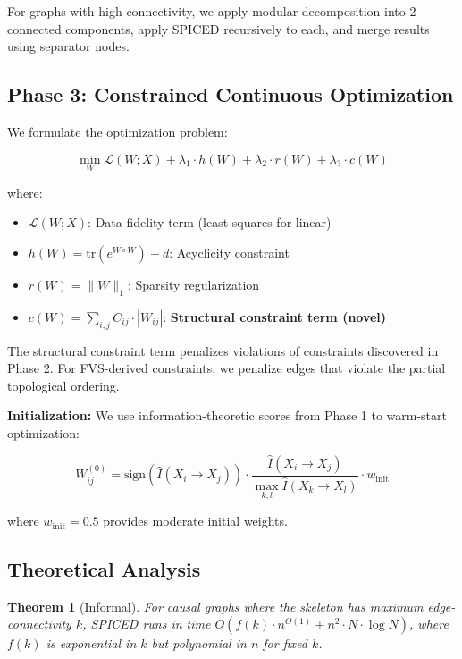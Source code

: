 \documentclass{article}
\newtheorem{theorem}{Theorem}
\begin{document}
For graphs with high connectivity, we apply modular decomposition into 2-connected components, apply SPICED recursively to each, and merge results using separator nodes.

\subsection{Phase 3: Constrained Continuous Optimization}

We formulate the optimization problem:

\begin{equation}
\min_{W} \mathcal{L}(W; X) + \lambda_1 \cdot h(W) + \lambda_2 \cdot r(W) + \lambda_3 \cdot c(W)
\label{eq:optimization}
\end{equation}

where:
\begin{itemize}
    \item $\mathcal{L}(W; X)$: Data fidelity term (least squares for linear)
    \item $h(W) = \text{tr}(e^{W \circ W}) - d$: Acyclicity constraint \citep{zheng2018dags}
    \item $r(W) = \|W\|_1$: Sparsity regularization
    \item $c(W) = \sum_{i,j} C_{ij} \cdot |W_{ij}|$: \textbf{Structural constraint term (novel)}
\end{itemize}

The structural constraint term penalizes violations of constraints discovered in Phase 2. For FVS-derived constraints, we penalize edges that violate the partial topological ordering.

\textbf{Initialization:} We use information-theoretic scores from Phase 1 to warm-start optimization:

\begin{equation}
W^{(0)}_{ij} = \text{sign}(\hat{I}(X_i \rightarrow X_j)) \cdot \frac{\hat{I}(X_i \rightarrow X_j)}{\max_{k,l} \hat{I}(X_k \rightarrow X_l)} \cdot w_{\text{init}}
\end{equation}

where $w_{\text{init}} = 0.5$ provides moderate initial weights.

\subsection{Theoretical Analysis}

\begin{theorem}[Informal]
For causal graphs where the skeleton has maximum edge-connectivity $k$, SPICED runs in time $O(f(k) \cdot n^{O(1)} + n^2 \cdot N \cdot \log N)$, where $f(k)$ is exponential in $k$ but polynomial in $n$ for fixed $k$.
\end{theorem}
\end{document}
